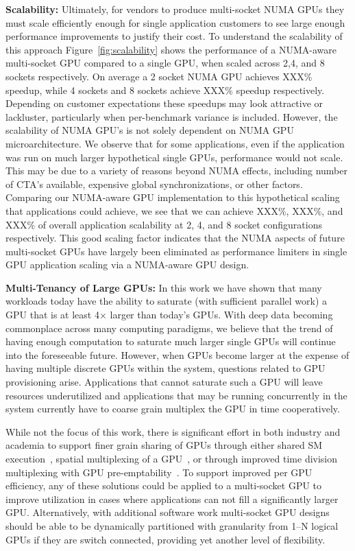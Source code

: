 \textbf{Scalability:} Ultimately, for vendors to produce multi-socket NUMA 
GPUs they must scale efficiently enough for single application customers to 
see large enough performance improvements to justify their cost.  To 
understand the scalability of this approach Figure~\ref{fig:scalability} 
shows the performance of a NUMA-aware multi-socket GPU compared to a single 
GPU, when scaled across 2,4, and 8 sockets respectively.  On average a 2 
socket NUMA GPU achieves XXX\% speedup, while 4 sockets and 8 sockets achieve 
XXX\% speedup respectively.  Depending on customer expectations these 
speedups may look attractive or lackluster, particularly when per-benchmark 
variance is included.  However, the scalability of NUMA GPU's is not solely 
dependent on NUMA GPU microarchitecture. We observe that for some 
applications, even if the application was run on much larger hypothetical 
single GPUs, performance would not scale.  This may be due to a variety of 
reasons beyond NUMA effects, including number of CTA's available, expensive 
global synchronizations, or other factors.  Comparing our NUMA-aware GPU 
implementation to this hypothetical scaling that applications could achieve, 
we see that we can achieve XXX\%, XXX\%, and XXX\% of overall application 
scalability at 2, 4, and 8 socket configurations respectively.  This good 
scaling factor indicates that the NUMA aspects of future multi-socket GPUs 
have largely been eliminated as performance limiters in single GPU 
application scaling via a NUMA-aware GPU design.

\textbf{Multi-Tenancy of Large GPUs:} In this work we have shown that many 
workloads today have the ability to saturate (with sufficient parallel work) 
a GPU that is at least 4$\times$ larger than today's GPUs.  With deep data 
becoming commonplace across many computing paradigms, we believe that the 
trend of having enough computation to saturate much larger single GPUs will 
continue into the foreseeable future. However, when GPUs become larger at the 
expense of having multiple discrete GPUs within the system, questions related 
to GPU provisioning arise.  Applications that cannot saturate such a GPU will 
leave resources underutilized and applications that may be running 
concurrently in the system currently have to coarse grain multiplex the GPU 
in time cooperatively. 

While not the focus of this work, there is significant effort in both 
industry and academia to support finer grain sharing of GPUs through either 
shared SM execution~\cite{XXX}, spatial multiplexing of a 
GPU~\cite{park2015chimera}, or through improved time division multiplexing 
with GPU pre-emptability~\cite{lin2016enabling}.  To support improved per GPU 
efficiency, any of these solutions could be applied to a multi-socket GPU to 
improve utilization in cases where applications can not fill a significantly 
larger GPU.  Alternatively, with additional software work multi-socket GPU 
designs should be able to be dynamically partitioned with granularity from 
1--N logical GPUs if they are switch connected, providing yet another level 
of flexibility.

